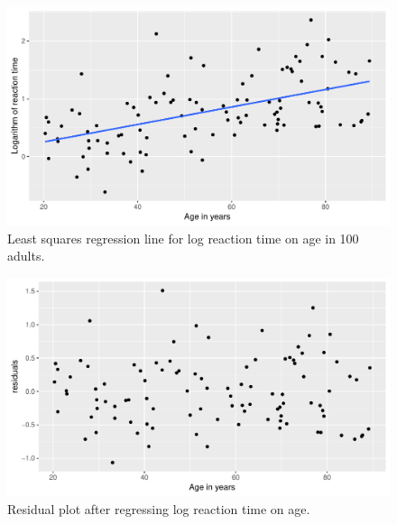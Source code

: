 \documentclass[]{report}\usepackage[]{graphicx}\usepackage[]{color}
\makeatletter
\def\maxwidth{ %
  \ifdim\Gin@nat@width>\linewidth
    \linewidth
  \else
    \Gin@nat@width
  \fi
}
\newenvironment{knitrout}{}{} %
\makeatother
\begin{document}
\begin{knitrout}
\color{fgcolor}\begin{figure}

{\centering \includegraphics[width=\maxwidth]{figure/ass_18-1} 

}

\caption[Least squares regression line for log reaction time on age in 100 adults]{Least squares regression line for log reaction time on age in 100 adults.}\label{fig:ass_18}
\end{figure}


\end{knitrout}

\begin{knitrout}
\color{fgcolor}\begin{figure}

{\centering \includegraphics[width=\maxwidth]{figure/ass_19-1} 

}

\caption[Residual plot after regressing log reaction time on age]{Residual plot after regressing log reaction time on age.}\label{fig:ass_19}
\end{figure}


\end{knitrout}
\end{document}
